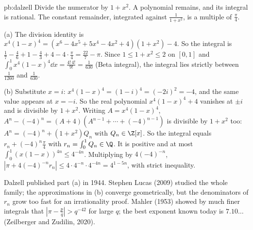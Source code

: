 \begin{solution}{pb:dalzell}
\idea Divide the numerator by $1+x^2$. A polynomial remains, and its integral is rational. The constant remainder, integrated against $\frac1{1+x^2}$, is a multiple of $\frac\pi4$.

\writeup (a) The division identity is $x^4(1-x)^4=(x^6-4x^5+5x^4-4x^2+4)(1+x^2)-4$. So the integral is
$\frac17-\frac46+1-\frac43+4-4\cdot\frac\pi4=\frac{22}7-\pi$. Since $1\le1+x^2\le2$ on $[0,1]$ and $\int_0^1x^4(1-x)^4\dd x=\frac{4!\,4!}{9!}=\frac1{630}$ (Beta
integral), the integral lies strictly between $\frac1{1260}$ and $\frac1{630}$.

(b) Substitute $x=i$: $x^4(1-x)^4=(1-i)^4=(-2i)^2=-4$, and the same value appears at $x=-i$. So the real polynomial $x^4(1-x)^4+4$ vanishes at $\pm i$ and is
divisible by $1+x^2$. Writing $A=x^4(1-x)^4$, $A^n-(-4)^n=(A+4)(A^{n-1}+\cdots+(-4)^{n-1})$ is divisible by $1+x^2$ too: $A^n=(-4)^n+(1+x^2)Q_n$ with
$Q_n\in\Z[x]$. So the integral equals $r_n+(-4)^n\frac\pi4$ with $r_n=\int_0^1Q_n\in\Q$. It is positive and at most $\int_0^1(x(1-x))^{4n}\le4^{-4n}$.
Multiplying by $4(-4)^{-n}$, $|\pi+4(-4)^{-n}r_n|\le4\cdot4^{-n}\cdot4^{-4n}=4^{1-5n}$, with strict inequality.

\leads Dalzell published part (a) in 1944. Stephen Lucas (2009) studied the whole family; the approximations in (b) converge
geometrically, but the denominators of $r_n$ grow too fast for an irrationality proof. Mahler (1953) showed by much finer integrals
that $|\pi-\frac pq|>q^{-42}$ for large $q$; the best exponent known today is $7.10\ldots$ (Zeilberger and Zudilin, 2020).
\end{solution}

